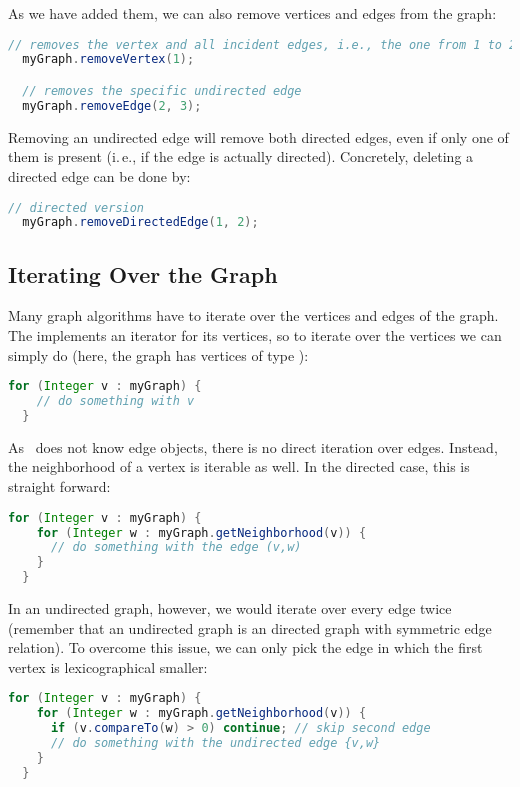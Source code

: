 \documentclass[a4paper, ukenglish, twoside, openright]{jdrasilmanual}
\begin{document}
As we have added them, we can also remove vertices and edges from the
graph:
\begin{lstlisting}[language=Java]
  // removes the vertex and all incident edges, i.e., the one from 1 to 2
  myGraph.removeVertex(1);

  // removes the specific undirected edge
  myGraph.removeEdge(2, 3);
\end{lstlisting}
Removing an undirected edge will remove both directed edges, even if
only one of them is present (i.\,e., if the edge is actually
directed). Concretely, deleting a directed edge can be done by:
\begin{lstlisting}[language=Java]
  // directed version
  myGraph.removeDirectedEdge(1, 2);
\end{lstlisting}
\subsection{Iterating Over the Graph}
Many graph algorithms have to iterate over the vertices and edges of
the graph. The  implements an iterator for its vertices,
so to iterate over the vertices we can simply do (here, the graph has
vertices of type ):
\begin{lstlisting}[language=Java]
  for (Integer v : myGraph) {
    // do something with v
  }
\end{lstlisting}
As \Jdrasil\ does not know edge objects, there is no direct iteration
over edges. Instead, the neighborhood of a vertex is iterable as well.
In the directed case, this is straight forward:
\begin{lstlisting}[language=Java]
  for (Integer v : myGraph) {
    for (Integer w : myGraph.getNeighborhood(v)) {
      // do something with the edge (v,w)
    }
  }
\end{lstlisting}
In an undirected graph, however, we would iterate over every edge
twice (remember that an undirected graph is an directed graph with
symmetric edge relation). To overcome this issue, we can only pick the edge
in which the first vertex is lexicographical smaller:
\begin{lstlisting}[language=Java]
  for (Integer v : myGraph) {
    for (Integer w : myGraph.getNeighborhood(v)) {
      if (v.compareTo(w) > 0) continue; // skip second edge
      // do something with the undirected edge {v,w}
    }
  }
\end{lstlisting}
\end{document}
